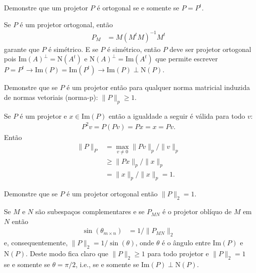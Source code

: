 \documentclass[a4paper,12pt, leqno, answers]{exam}
\begin{document}
\begin{questions}
     Demonstre que um projetor $P$ \'{e} ortogonal se e somente se $P = P^t$.
    \begin{solution}
        Se $P$ \'{e} um projetor ortogonal, ent\~{a}o
        \begin{align*}
            P_M &= M \left( M^t M \right)^{-1} M^t
        \end{align*}
        garante que $P$ \'{e} sim\'{e}trico. E se $P$ \'{e} sim\'{e}trico, ent\~{a}o $P$ deve ser projetor ortogonal pois $\text{Im}(A)^\perp = \text{N}(A^t)$ e $\text{N}(A)^\perp = \text{Im}(A^t)$ que permite escrever $P = P^t \rightarrow \text{Im}(P) = \text{Im}(P^t) \rightarrow \text{Im}(P) \perp \text{N}(P)$.
    \end{solution}

    \question Demonstre que se $P$ \'{e} um projetor ent\~{a}o para qualquer norma matricial induzida de normas vetoriais (norma-p): $\| P \|_p \geq 1$.
    \begin{solution}
        Se $P$ \'{e} um projetor e $x \in \text{Im}(P)$ ent\~{a}o a igualdade a seguir \'{e} v\'{a}lida para todo $v$:
        \begin{align*}
            P^2 v = P \left( P v \right) = P x = x = P v.
        \end{align*}
        Ent\~{a}o
        \begin{align*}
            \| P \|_P &= \max_{v \neq 0} \| P v \|_p / \| v \|_p \\
            &\geq \| P x \|_p / \| x \|_p \\
            &= \| x \|_p / \| x \|_p = 1.
        \end{align*}
    \end{solution}

     Demonstre que se $P$ \'{e} um projetor ortogonal ent\~{a}o $\| P \|_2 = 1$.
    \begin{solution}
        Se $M$ e $N$ s\~{a}o subespa\c{c}os complementares e se $P_{MN}$ \'{e} o projetor obl\'{i}quo de $M$ em $N$ ent\~{a}o
        \begin{align*}
            \sin(\theta_{m \times n}) &= 1 / \| P_{MN} \|_2
        \end{align*}
        e, consequentemente, $\| P \|_2 = 1 / \sin(\theta)$, onde $\theta$ \'{e} o \^{a}ngulo entre $\text{Im}(P)$ e $\text{N}(P)$. Deste modo fica claro que $\| P \|_2 \geq 1$ para todo projetor e $\| P \|_2 = 1$ se e somente se $\theta = \pi / 2$, i.e., se e somente se $\text{Im}(P) \perp \text{N}(P)$.
    \end{solution}


\end{questions}
\end{document}
